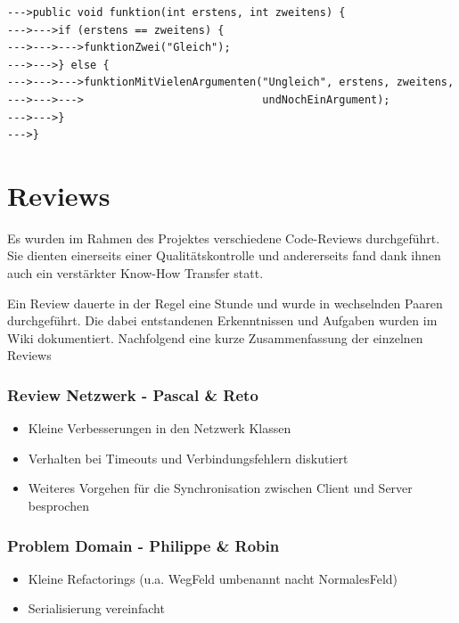 \documentclass[12pt,halfparskip]{scrartcl}
\begin{document}
\begin{verbatim}
--->public void funktion(int erstens, int zweitens) {
--->--->if (erstens == zweitens) {
--->--->--->funktionZwei("Gleich");
--->--->} else {
--->--->--->funktionMitVielenArgumenten("Ungleich", erstens, zweitens,
--->--->--->                            undNochEinArgument);
--->--->}
--->}
\end{verbatim}

\section{Reviews} %
\label{sec:reviews}
Es wurden im Rahmen des Projektes verschiedene Code-Reviews durchgeführt. Sie dienten einerseits einer Qualitätskontrolle und andererseits fand dank ihnen auch ein verstärkter Know-How Transfer statt.

Ein Review dauerte in der Regel eine Stunde und wurde in wechselnden Paaren durchgeführt. Die dabei entstandenen Erkenntnissen und Aufgaben wurden im Wiki dokumentiert. Nachfolgend eine kurze Zusammenfassung der einzelnen Reviews

\subsubsection{Review Netzwerk - Pascal \& Reto}
\label{ssub:review_netzwerk_pascal_amp_reto}

\begin{itemize}
	\item Kleine Verbesserungen in den Netzwerk Klassen
	\item Verhalten bei Timeouts und Verbindungsfehlern diskutiert
	\item Weiteres Vorgehen für die Synchronisation zwischen Client und Server besprochen
\end{itemize}


\subsubsection{Problem Domain - Philippe \& Robin}
\label{ssub:problem_domain_philippe_amp_robin}

\begin{itemize}
	\item Kleine Refactorings (u.a. WegFeld umbenannt nacht NormalesFeld)
	\item Serialisierung vereinfacht
\end{itemize}
\end{document}
